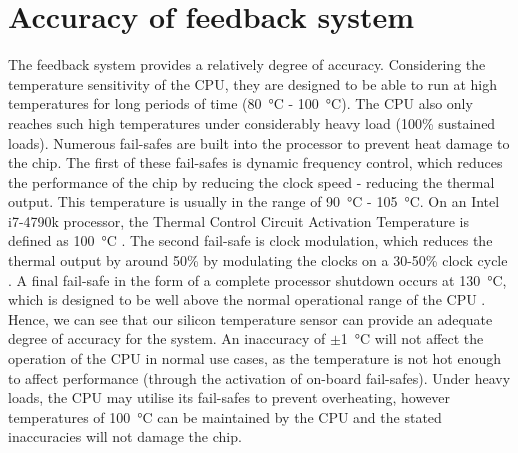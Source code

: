 \documentclass[conference]{IEEEtran}
\begin{document}
\section{Accuracy of feedback system}
The feedback system provides a relatively degree of accuracy. Considering the temperature sensitivity of the CPU, they are designed to be able to run at high temperatures for long periods of time (\SI{80}{\celsius} - \SI{100}{\celsius}). The CPU also only reaches such high temperatures under considerably heavy load (100\% sustained loads). Numerous fail-safes are built into the processor to prevent heat damage to the chip. The first of these fail-safes is dynamic frequency control, which reduces the performance of the chip by reducing the clock speed - reducing the thermal output. This temperature is usually in the range of \SI{90}{\celsius} - \SI{105}{\celsius}. On an Intel i7-4790k processor, the Thermal Control Circuit Activation Temperature is defined as \SI{100}{\celsius} \cite{b5}. The second fail-safe is clock modulation, which reduces the thermal output by around 50\% by modulating the clocks on a 30-50\% clock cycle \cite{b5}. A final fail-safe in the form of a complete processor shutdown occurs at \SI{130}{\celsius}, which is designed to be well above the normal operational range of the CPU \cite{b5}. Hence, we can see that our silicon temperature sensor can provide an adequate degree of accuracy for the system. An inaccuracy of $\pm$\SI{1}{\celsius} will not affect the operation of the CPU in normal use cases, as the temperature is not hot enough to affect performance (through the activation of on-board fail-safes). Under heavy loads, the CPU may utilise its fail-safes to prevent overheating, however temperatures of \SI{100}{\celsius} can be maintained by the CPU and the stated inaccuracies will not damage the chip.  
\end{document}

